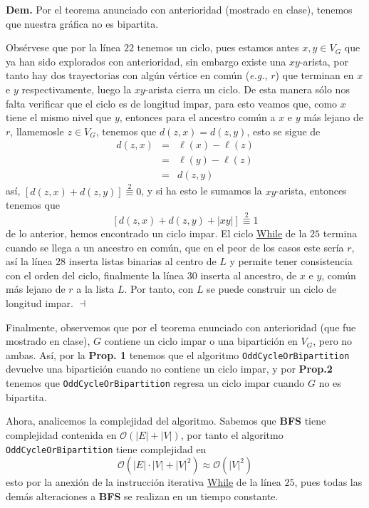 \documentclass{article}
\newcommand{\code}[1]{\textcolor{white!25!black}{\texttt{#1}}}
\begin{document}
\textbf{Dem.} Por el teorema anunciado con anterioridad (mostrado en clase), tenemos
que nuestra gr\'afica no es bipartita.

Obs\'ervese que por la l\'inea $22$ tenemos un ciclo, pues estamos antes $x,y \in V_G$
que ya han sido explorados con anterioridad, sin embargo existe una $xy$-arista, por
tanto hay dos trayectorias con alg\'un v\'ertice en com\'un (\textit{e.g.}, $r$) que terminan
en $x$ e $y$ respectivamente, luego la $xy$-arista cierra un ciclo. De esta manera s\'olo
nos falta verificar que el ciclo es de longitud impar, para esto veamos que, como $x$ tiene
el mismo nivel que $y$, entonces para el ancestro com\'un a $x$ e $y$ m\'as lejano de $r$,
llamemosle $z \in V_G$, tenemos que $d(z,x) = d(z,y)$, esto se sigue de
\begin{eqnarray*}
  d(z,x) &=& \ell(x) - \ell(z)\\
  &=& \ell(y) - \ell(z)\\
  &=& d(z,y)
\end{eqnarray*}
as\'i, $[d(z,x) + d(z,y)] \stackrel{2}{\equiv}0$, y si ha esto le sumamos la $xy$-arista,
entonces tenemos que
\[
[d(z,x) + d(z,y) + |xy|] \stackrel{2}{\equiv}1
\]
de lo anterior, hemos encontrado un ciclo impar. El ciclo \underline{While} de la $25$
termina cuando se llega a un ancestro en com\'un, que en el peor de los casos este ser\'ia
$r$, as\'i la l\'inea $28$ inserta listas binarias al centro de $L$ y permite tener consistencia
con el orden del ciclo, finalmente la l\'inea $30$ inserta al ancestro, de $x$ e $y$, com\'un
m\'as lejano de $r$ a la lista $L$. Por tanto, con $L$ se puede construir un ciclo de
longitud impar.
\hfill $\dashv$

Finalmente, observemos que por el teorema enunciado con anterioridad (que fue mostrado en clase),
$G$ contiene un ciclo impar o una bipartici\'on en $V_G$, pero no ambas. As\'i, por la \textbf{Prop. 1}
tenemos que el algoritmo \code{OddCycleOrBipartition} devuelve una bipartici\'on cuando no contiene
un ciclo impar, y por \textbf{Prop.2} tenemos que \code{OddCycleOrBipartition} regresa un ciclo
impar cuando $G$ no es bipartita.

Ahora, analicemos la complejidad del algoritmo. Sabemos que \textbf{BFS}
tiene complejidad contenida en $\mathcal{O}(|E| + |V|)$, por tanto el
algoritmo \code{OddCycleOrBipartition} tiene complejidad en
\[
\mathcal{O}(|E|\cdot|V| + |V|^2) \approx \mathcal{O}(|V|^2)
\]
esto por la anexi\'on de la instrucci\'on iterativa \underline{While} de
la l\'inea $25$, pues todas las dem\'as alteraciones a \textbf{BFS} se
realizan en un tiempo constante.
\end{document}
